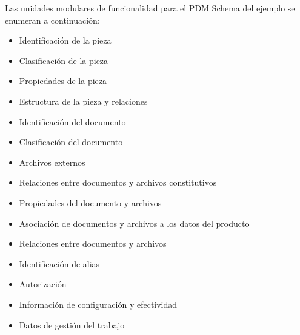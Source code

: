 Las unidades modulares de funcionalidad para el PDM Schema del ejemplo se enumeran a continuación:

\begin{itemize}
    \item Identificación de la pieza
    \item Clasificación de la pieza
    \item Propiedades de la pieza
    \item Estructura de la pieza y relaciones
    \item Identificación del documento
    \item Clasificación del documento
    \item Archivos externos
    \item Relaciones entre documentos y archivos constitutivos
    \item Propiedades del documento y archivos
    \item Asociación de documentos y archivos a los datos del producto
    \item Relaciones entre documentos y archivos
    \item Identificación de alias
    \item Autorización
    \item Información de configuración y efectividad
    \item Datos de gestión del trabajo
\end{itemize}

